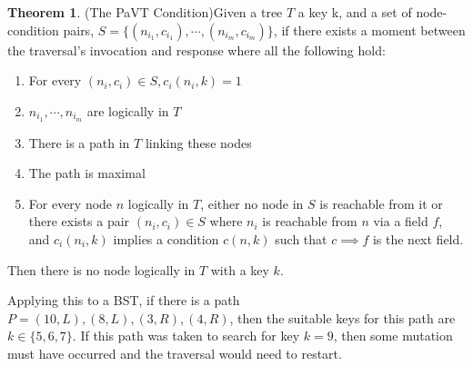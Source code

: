 \documentclass[conference]{IEEEtran}
\theoremstyle{definition}
\theoremstyle{theorem}
\newtheorem{theorem}{Theorem}[section]
\begin{document}
\begin{theorem} {(The PaVT Condition)}\label{thm:pavt}
Given a tree $T$ a key k, and a set of node-condition pairs, $S=\{(n_{i_1}, c_{i_1}),\cdots, (n_{i_m}, c_{i_m})\}$, if there exists a moment between the traversal's invocation and response where all the following hold:
\begin{enumerate}
\item For every $(n_i, c_i) \in  S, c_i(n_i, k) = 1$
\item $n_{i_1},\cdots, n_{i_m}$ are logically in $T$
\item There is a path in $T$ linking these nodes
\item The path is maximal
\item For every node $n$ logically in $T$, either no node in $S$ is reachable from it or there exists a pair $(n_i, c_i)\in S$ where $n_i$ is reachable from $n$ via a field $f$, and $c_i(n_i, k)$ implies a condition $c(n, k)$ such that $c \implies f$ is the next field.
\end{enumerate}
Then there is no node logically in $T$ with a key $k$.
\end{theorem}

Applying this to a BST, if there is a path $P=(10,L),(8,L),(3,R),(4,R)$, then the suitable keys for this path are $k\in\{5, 6, 7\}$. If this path was taken to search for key $k=9$, then some mutation must have occurred and the traversal would need to restart.   
\end{document}
